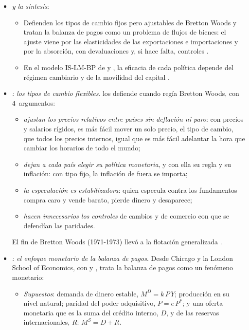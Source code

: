 \documentclass[11pt]{article}
\begin{document}
\begin{itemize}
\item \emph{ y la síntesis}:
  \begin{itemize}
  \item Defienden los tipos de cambio fijos pero ajustables de Bretton Woods y tratan la balanza de pagos como un problema de flujos de bienes: el ajuste viene por las elasticidades de las exportaciones e importaciones y por la absorción, con devaluaciones y, si hace falta, controles .
  \item En el modelo IS-LM-BP de  y , la eficacia de cada política depende del régimen cambiario y de la movilidad del capital .
  \end{itemize}
\item \emph{: los tipos de cambio flexibles}. \textcite{Friedman1953Case} los defiende cuando regía Bretton Woods, con 4~argumentos:
  \begin{itemize}
  \item \emph{ajustan los precios relativos entre países sin deflación ni paro}: con precios y salarios rígidos, es más fácil mover un solo precio, el tipo de cambio, que todos los precios internos, igual que es más fácil adelantar la hora que cambiar los horarios de todo el mundo;
  \item \emph{dejan a cada país elegir su política monetaria}, y con ella su regla y su inflación: con tipo fijo, la inflación de fuera se importa;
  \item \emph{la especulación es estabilizadora}: quien especula contra los fundamentos compra caro y vende barato, pierde dinero y desaparece;
  \item \emph{hacen innecesarios los controles} de cambios y de comercio con que se defendían las paridades.
  \end{itemize}
  El fin de Bretton Woods (1971-1973) llevó a la flotación generalizada  .
\item \emph{: el enfoque monetario de la balanza de pagos}. Desde Chicago y la London School of Economics, con  y , trata la balanza de pagos como un fenómeno monetario\nocite{FrenkelJohnson1976Monetary}:
  \begin{itemize}
  \item \emph{Supuestos}: demanda de dinero estable, $M^D=k\,P\,Y$; producción en su nivel natural; paridad del poder adquisitivo, $P=e\,P^*$; y una oferta monetaria que es la suma del crédito interno, $D$, y de las reservas internacionales, $R$: $M^S=D+R$.

\end{itemize}
\end{itemize}
\end{document}
